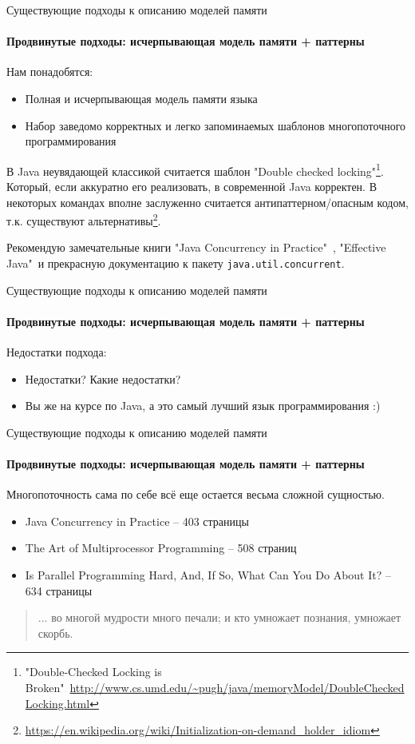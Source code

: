 \begin{frame}{Существующие подходы к описанию моделей памяти}
\framesubtitle{Продвинутые подходы: исчерпывающая модель памяти + паттерны}

Нам понадобятся:
\begin{itemize}
	\item Полная и исчерпывающая модель памяти языка
	\item Набор заведомо корректных и легко запоминаемых шаблонов многопоточного программирования
\end{itemize}

\pause
В Java неувядающей классикой считается шаблон "Double checked locking"\footnote<2->{\tiny"Double-Checked Locking is Broken"\ \url{http://www.cs.umd.edu/~pugh/java/memoryModel/DoubleCheckedLocking.html}}.
\pause
Который, если аккуратно его реализовать, в современной Java корректен. В некоторых командах вполне заслуженно считается антипаттерном/опасным кодом, т.к. существуют альтернативы\footnote<3->{\tiny\url{https://en.wikipedia.org/wiki/Initialization-on-demand_holder_idiom}}.
 
\pause
Рекомендую замечательные книги "Java Concurrency in Practice"\ , "Effective Java"\ и прекрасную документацию к пакету \texttt{java.util.concurrent}.


\end{frame}

\begin{frame}[t]{Существующие подходы к описанию моделей памяти}
\framesubtitle{Продвинутые подходы: исчерпывающая модель памяти + паттерны}

\pause
Недостатки подхода:

\pause
 \begin{itemize}
 	\item Недостатки? Какие недостатки?
 	\pause
 	\item Вы же на курсе по Java, а это самый лучший язык программирования :)
 \end{itemize}

\end{frame}


\begin{frame}{Существующие подходы к описанию моделей памяти}
\framesubtitle{Продвинутые подходы: исчерпывающая модель памяти + паттерны}

Многопоточность сама по себе всё еще остается весьма сложной сущностью.
\begin{itemize}
	\item Java Concurrency in Practice -- 403 страницы
	\item The Art of Multiprocessor Programming -- 508 страниц
	\item Is Parallel Programming Hard, And, If So, What Can You Do About It? -- 634 страницы
\end{itemize}

\pause
\begin{quote}
 ... во многой мудрости много печали; и кто умножает познания, умножает скорбь.
\end{quote}
\end{frame}


